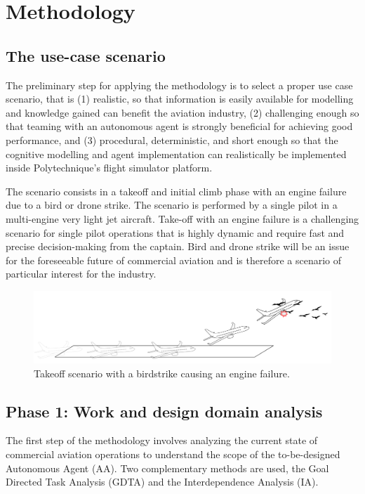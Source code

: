 \documentclass[12pt,a4paper]{article} %
\begin{document}
	
	\section{Methodology} %
	\subsection{The use-case scenario}
	The preliminary step for applying the methodology is to select a proper use case scenario, that is (1) realistic, so that information is easily available for modelling and knowledge gained can benefit the aviation industry, (2) challenging enough so that teaming with an autonomous agent is strongly beneficial for achieving good performance, and (3) procedural, deterministic, and short enough so that the cognitive modelling and agent implementation can realistically be implemented inside Polytechnique's flight simulator platform.
	
	The scenario consists in a takeoff and initial climb phase with an engine failure due to a bird or drone strike. The scenario is performed by a single pilot in a multi-engine very light jet aircraft. Take-off with an engine failure is a challenging scenario for single pilot operations that is highly dynamic and require fast and precise decision-making from the captain. Bird and drone strike will be an issue for the foreseeable future of commercial aviation and is therefore a scenario of particular interest for the industry.

	\begin{figure}[H]
 		\centering
  		\includegraphics[width=1\textwidth]{./images/scenario.png}
   		\caption{Takeoff scenario with a birdstrike causing an engine failure.}
		\label{fig:takeoff-scenario-simplified}
	\end{figure}

	\subsection{Phase 1: Work and design domain analysis}
	The first step of the methodology involves analyzing the current state of commercial aviation operations to understand the scope of the to-be-designed Autonomous Agent (AA). Two complementary methods are used, the Goal Directed Task Analysis (GDTA) and the Interdependence Analysis (IA).
\end{document}
